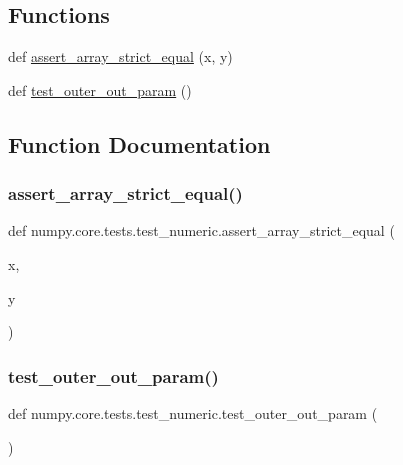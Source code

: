 \subsection*{Functions}
\begin{DoxyCompactItemize}
\item 
def \hyperlink{namespacenumpy_1_1core_1_1tests_1_1test__numeric_acb1db906eb96eb3a6c70cee861c302ce}{assert\+\_\+array\+\_\+strict\+\_\+equal} (x, y)
\item 
def \hyperlink{namespacenumpy_1_1core_1_1tests_1_1test__numeric_afa88f6887dc8aa09ffe09587855538a4}{test\+\_\+outer\+\_\+out\+\_\+param} ()
\end{DoxyCompactItemize}


\subsection{Function Documentation}
\mbox{\label{namespacenumpy_1_1core_1_1tests_1_1test__numeric_acb1db906eb96eb3a6c70cee861c302ce}} 
\subsubsection{\texorpdfstring{assert\+\_\+array\+\_\+strict\+\_\+equal()}{assert\_array\_strict\_equal()}}
{\footnotesize\ttfamily def numpy.\+core.\+tests.\+test\+\_\+numeric.\+assert\+\_\+array\+\_\+strict\+\_\+equal (\begin{DoxyParamCaption}\item[{}]{x,  }\item[{}]{y }\end{DoxyParamCaption})}

\mbox{\label{namespacenumpy_1_1core_1_1tests_1_1test__numeric_afa88f6887dc8aa09ffe09587855538a4}} 
\subsubsection{\texorpdfstring{test\+\_\+outer\+\_\+out\+\_\+param()}{test\_outer\_out\_param()}}
{\footnotesize\ttfamily def numpy.\+core.\+tests.\+test\+\_\+numeric.\+test\+\_\+outer\+\_\+out\+\_\+param (\begin{DoxyParamCaption}{ }\end{DoxyParamCaption})}

